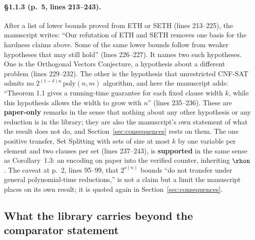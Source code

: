 \paragraph{\S1.1.3 (p.~5, lines 213--243).}
After a list of lower bounds proved from ETH or SETH (lines 213--225),
the manuscript writes: ``Our refutation of ETH and SETH removes one basis
for the hardness claims above. Some of the same lower bounds follow from
weaker hypotheses that may still hold'' (lines 226--227). It names two such hypotheses. One is the Orthogonal Vectors Conjecture, a hypothesis about a different problem (lines 229--232). The other is the hypothesis that
unrestricted CNF-SAT admits no $2^{(1-\delta)n}\,\mathrm{poly}(n,m)$
algorithm, and here the manuscript adds: ``Theorem 1.1 gives a running-time guarantee for each
fixed clause width $k$, while this hypothesis allows the width to grow
with $n$'' (lines 235--236). These are \textbf{paper-only} remarks in
the sense that nothing about any other hypothesis or any reduction is in
the library; they are also the manuscript's own statement of what the
result does not do, and Section~\ref{sec:consequences} rests on them.
The one positive transfer, Set Splitting with sets of size at most $k$
by one variable per element and two clauses per set (lines 237--243), is
\textbf{supported} in the same sense as Corollary~1.3: an encoding on
paper into the verified counter, inheriting $\rhon$. The caveat at
p.~2, lines 95--99, that $2^{o(n)}$ bounds ``do not transfer under
general polynomial-time reductions,'' is not a claim but a limit the
manuscript places on its own result; it is quoted again in
Section~\ref{sec:consequences}.

\subsection{What the library carries beyond the comparator statement}
\label{sec:beyond-lean}

